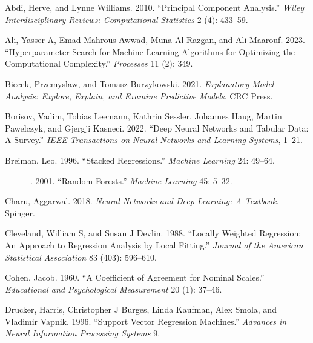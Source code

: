 \documentclass[
  letterpaper,
  DIV=11,
  numbers=noendperiod]{scrartcl}
\newlength{\cslhangindent}
\newlength{\cslentryspacingunit} %
\newenvironment{CSLReferences}[2] %
 {%
  \setlength{\parindent}{0pt}
  \ifodd #1
  \let\oldpar\par
  \def\par{\hangindent=\cslhangindent\oldpar}
  \fi
  \setlength{\parskip}{#2\cslentryspacingunit}
 }%
 {}
\begin{document}
\hypertarget{refs}{}
\begin{CSLReferences}{1}{0}
\leavevmode{}%
Abdi, Herve, and Lynne Williams. 2010. {``Principal Component
Analysis.''} \emph{Wiley Interdisciplinary Reviews: Computational
Statistics} 2 (4): 433--59.

\leavevmode{}%
Ali, Yasser A, Emad Mahrous Awwad, Muna Al-Razgan, and Ali Maarouf.
2023. {``Hyperparameter Search for Machine Learning Algorithms for
Optimizing the Computational Complexity.''} \emph{Processes} 11 (2):
349.

\leavevmode{}%
Biecek, Przemyslaw, and Tomasz Burzykowski. 2021. \emph{Explanatory
Model Analysis: Explore, Explain, and Examine Predictive Models}. CRC
Press.

\leavevmode{}%
Borisov, Vadim, Tobias Leemann, Kathrin Sessler, Johannes Haug, Martin
Pawelczyk, and Gjergji Kasneci. 2022. {``Deep Neural Networks and
Tabular Data: A Survey.''} \emph{{IEEE} Transactions on Neural Networks
and Learning Systems}, 1--21.

\leavevmode{}%
Breiman, Leo. 1996. {``Stacked Regressions.''} \emph{Machine Learning}
24: 49--64.

\leavevmode{}%
---------. 2001. {``Random Forests.''} \emph{Machine Learning} 45:
5--32.

\leavevmode{}%
Charu, Aggarwal. 2018. \emph{Neural Networks and Deep Learning: A
Textbook}. Spinger.

\leavevmode{}%
Cleveland, William S, and Susan J Devlin. 1988. {``Locally Weighted
Regression: An Approach to Regression Analysis by Local Fitting.''}
\emph{Journal of the American Statistical Association} 83 (403):
596--610.

\leavevmode{}%
Cohen, Jacob. 1960. {``A Coefficient of Agreement for Nominal Scales.''}
\emph{Educational and Psychological Measurement} 20 (1): 37--46.

\leavevmode{}%
Drucker, Harris, Christopher J Burges, Linda Kaufman, Alex Smola, and
Vladimir Vapnik. 1996. {``Support Vector Regression Machines.''}
\emph{Advances in Neural Information Processing Systems} 9.


\end{CSLReferences}
\end{document}
